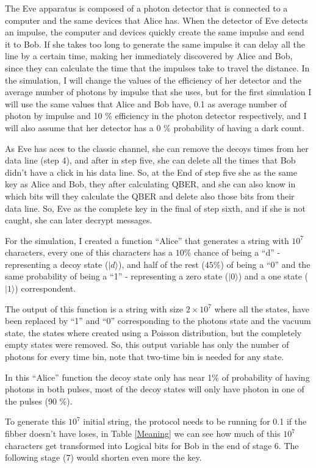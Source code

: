 \begin{refsection}
The Eve apparatus is composed of a photon detector that is connected to a computer and the same devices that Alice has. When the detector of Eve detects an impulse, the computer and devices quickly create the same impulse and send it to Bob. If she takes too long to generate the same impulse it can delay all the line by a certain time, making her immediately discovered by Alice and Bob, since they can calculate the time that the impulses take to travel the distance. In the simulation, I will change the values of the efficiency of her detector and the average number of photons by impulse that she uses, but for the first simulation I will use the same values that Alice and Bob have, 0.1 as average number of photon by impulse and 10 \% efficiency in the photon detector respectively, and I will also assume that her detector has a 0 \% probability of having a dark count.

As Eve has aces to the classic channel, she can remove the decoys times from her data line (step 4), and after in step five, she can delete all the times that Bob didn't have a click in his data line. So, at the End of step five she as the same key as Alice and Bob, they after calculating QBER, and she can also know in which bits will they calculate the QBER and delete also those bits from their data line. So, Eve as the complete key in the final of step sixth, and if she is not caught, she can later decrypt messages.

For the simulation, I created a function ``Alice'' that generates a string with $10^7$ characters, every one of this characters has a $10 \%$ chance of being a ``d'' - representing a decoy state ($|d\rangle$), and half of the rest ($45 \%$) of being a ``0'' and the same probability of being a ``1'' - representing a zero state ($|0\rangle$) and a one state ($|1\rangle$) correspondent. 

The output of this function is a string with size $2\times10^7$ where all the states, have been replaced by ``1'' and ``0'' corresponding to the photons state and the vacuum state, the states where created using a Poisson distribution, but the completely empty states were removed. So, this output variable has only the number of photons for every time bin, note that two-time bin is needed for any state.

In this ``Alice'' function the decoy state only has near 1\% of probability of having photons in both pulses, most of the decoy states will only have photon in one of the pulses (90 \%).

To generate this $10^7$ initial string, the protocol needs to be running for 0.1 if the fibber doesn't have loses, in Table \ref{Meaning} we can see how much of this $10^7$ characters get transformed into Logical bits for Bob in the end of stage 6. The following stage (7) would shorten even more the key.



\end{refsection}
